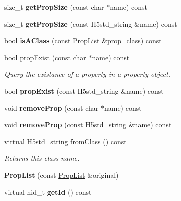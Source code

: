 \begin{DoxyCompactItemize}
size\+\_\+t {\bfseries get\+Prop\+Size} (const char $\ast$name) const
\item 
\mbox{\label{class_h5_1_1_prop_list_a5f424f1d19830fd7449827414ccf7580}} 
size\+\_\+t {\bfseries get\+Prop\+Size} (const H5std\+\_\+string \&name) const
\item 
\mbox{\label{class_h5_1_1_prop_list_a37f2a0f4ae4d8e9a4b8ccb1df3930b4b}} 
bool {\bfseries is\+A\+Class} (const \hyperlink{class_h5_1_1_prop_list}{Prop\+List} \&prop\+\_\+class) const
\item 
\mbox{\label{class_h5_1_1_prop_list_ada762c40ae01214c7f4fb283b3451b11}} 
bool \hyperlink{class_h5_1_1_prop_list_ada762c40ae01214c7f4fb283b3451b11}{prop\+Exist} (const char $\ast$name) const
\begin{DoxyCompactList}\small\item\em Query the existance of a property in a property object. \end{DoxyCompactList}\item 
\mbox{\label{class_h5_1_1_prop_list_afafa6a7bbfb8197b061c9ccc4ed20ecd}} 
bool {\bfseries prop\+Exist} (const H5std\+\_\+string \&name) const
\item 
\mbox{\label{class_h5_1_1_prop_list_a8fcfd914b3b1d2dddfe58043c41c20d6}} 
void {\bfseries remove\+Prop} (const char $\ast$name) const
\item 
\mbox{\label{class_h5_1_1_prop_list_ad4673c105a4a0963efcbb79818b051f5}} 
void {\bfseries remove\+Prop} (const H5std\+\_\+string \&name) const
\item 
\mbox{\label{class_h5_1_1_prop_list_a090ada6d21725f711f017b5457383077}} 
virtual H5std\+\_\+string \hyperlink{class_h5_1_1_prop_list_a090ada6d21725f711f017b5457383077}{from\+Class} () const
\begin{DoxyCompactList}\small\item\em Returns this class name. \end{DoxyCompactList}\item 
\mbox{\label{class_h5_1_1_prop_list_a8f3198e63cf76ac921c7aff75256f6a7}} 
{\bfseries Prop\+List} (const \hyperlink{class_h5_1_1_prop_list}{Prop\+List} \&original)
\item 
\mbox{\label{class_h5_1_1_prop_list_a619a8caaa337e60d9d159db932ae2fb0}} 
virtual hid\+\_\+t {\bfseries get\+Id} () const
\end{DoxyCompactItemize}
